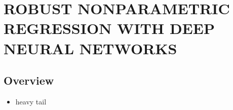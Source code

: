 
\chapter{ROBUST NONPARAMETRIC REGRESSION WITH DEEP NEURAL NETWORKS}
\section*{Overview}


\begin{itemize}
    \item heavy tail 
\end{itemize}